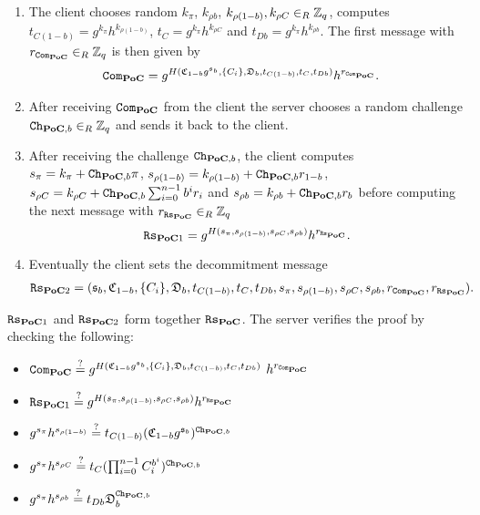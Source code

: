 \begin{enumerate}
  \item %
    The client chooses random $k_{\pi}$, $k_{\rho b}$, $k_{\rho (1-b)}, k_{\rho C}\in_R\mathbb{Z}_q$, computes $t_{C(1-b)}=g^{k_{\pi}}h^{k_{\rho (1-b)}}$, $t_{C}=g^{k_\pi}h^{k_{\rho C}}$ and $t_{Db}=g^{k_{\pi}}h^{k_{\rho b}}$.
    The first message with $r_{\mathtt{Com}_{\mathsf{\bf PoC}}}\in_R\mathbb{Z}_q$ is then given by
    \begin{align*}      
    & \mathtt{Com}_{\mathsf{\bf PoC}}=g^{H(\mathfrak{C}_{1-b}g^{\mathfrak{s}_b}, \{C_i\}, \mathfrak{D}_b, t_{C(1-b)}, t_C, t_{Db})} h^{r_{\mathtt{Com}_{\mathsf{\bf PoC}}}}.
    \end{align*}

  \item %
    After receiving $\mathtt{Com}_{\mathsf{\bf PoC}}$ from the client the server chooses a random challenge $\mathtt{Ch}_{\mathsf{\bf PoC},b}\in_R\mathbb{Z}_q$ and sends it back to the client.

  \item %
    After receiving the challenge $\mathtt{Ch}_{\mathsf{\bf PoC}, b}$, the client computes $s_{\pi}=k_{\pi}+\mathtt{Ch}_{\mathsf{\bf PoC},b}\pi$, $s_{\rho (1-b)}=k_{\rho{(1-b)}}+\mathtt{Ch}_{\mathsf{\bf PoC},b}r_{1-b}$, $s_{\rho C}=k_{\rho C} + \mathtt{Ch}_{\mathsf{\bf PoC},b} \sum_{i=0}^{n-1}b^i r_i$ and $s_{\rho b}=k_{\rho{b}}+\mathtt{Ch}_{\mathsf{\bf PoC},b}r_{b}$ before computing the next message with $r_{\mathtt{Rs}_{\mathsf{\bf PoC}}}\in_R\mathbb{Z}_q$
    \[\mathtt{Rs}_{\mathsf{\bf PoC}1}=g^{H(s_{\pi}, s_{\rho (1-b)}, s_{\rho C}, s_{\rho b})} h^{r_{\mathtt{Rs}_{\mathsf{\bf PoC}}}}.\]

  \item %
    Eventually the client sets the decommitment message
    \begin{align*}
    & \mathtt{Rs}_{\mathsf{\bf PoC}2}=(\mathfrak{s}_b, \mathfrak{C}_{1-b}, \{C_i\}, \mathfrak{D}_b, t_{C(1-b)}, t_C, t_{Db}, s_{\pi}, s_{\rho (1-b)}, s_{\rho C}, s_{\rho b}, r_{\mathtt{Com}_{\mathsf{\bf PoC}}}, r_{\mathtt{Rs}_{\mathsf{\bf PoC}}}).
    \end{align*}
\end{enumerate}

\noindent
$\mathtt{Rs}_{\mathsf{\bf PoC}1}$ and $\mathtt{Rs}_{\mathsf{\bf PoC}2}$ form together $\mathtt{Rs}_{\mathsf{\bf PoC}}$.
The server verifies the proof by checking the following:
\begin{itemize}[leftmargin=*]
  \item $\mathtt{Com}_{\mathsf{\bf PoC}} \stackrel{?}{=} g^{H(\mathfrak{C}_{1-b}g^{\mathfrak{s}_b}, \{C_i\}, \mathfrak{D}_b, t_{C(1-b)}, t_C, t_{Db})}$ $h^{r_{\mathtt{Com}_{\mathsf{\bf PoC}}}}$
  \item $\mathtt{Rs}_{\mathsf{\bf PoC}1} \stackrel{?}{=} g^{H(s_{\pi}, s_{\rho (1-b)}, s_{\rho C}, s_{\rho b})} h^{r_{\mathtt{Rs}_{\mathsf{\bf PoC}}}}$
  \item $g^{s_{\pi}}h^{s_{\rho (1-b)}} \stackrel{?}{=} t_{C(1-b)}(\mathfrak{C}_{1-b}g^{\mathfrak{s}_b})^{\mathtt{Ch}_{\mathsf{\bf PoC},b}}$
  \item $g^{s_{\pi}}h^{s_{\rho C}} \stackrel{?}{=} t_{C}(\prod_{i=0}^{n-1} C_i^{b^i})^{\mathtt{Ch}_{\mathsf{\bf PoC},b}}$
  \item $g^{s_{\pi}}h^{s_{\rho b}} \stackrel{?}{=} t_{Db}\mathfrak{D}_{b}^{\mathtt{Ch}_{\mathsf{\bf PoC},b}}$
\end{itemize}

